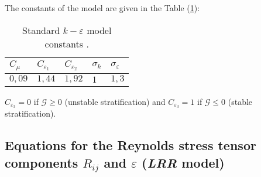 The constants of the model are given in the Table (\ref{tab:k_epsilon_constants}):
\begin{table}[htp]
\centering
\begin{tabular}{p{}|p{}|p{}|p{}|p{}}
$C_\mu$ & $C_{\varepsilon_1}$ & $C_{\varepsilon_2}$ & $\sigma_k$ & $%
\sigma_\varepsilon$ \\ \hline
$0,09$ & $1,44$ & $1,92$ & $1$ & $1,3$ 
\end{tabular}%
\caption{Standard $k-\varepsilon$ model constants \cite{Launder:1972}.\label{tab:k_epsilon_constants}}
\end{table}

$C_{\varepsilon_3}=0$ if $\mathcal{G}\geqslant0$ (unstable stratification)
and $C_{\varepsilon_3}=1$ if $\mathcal{G}\leqslant0$ (stable stratification).


\subsection{Equations for the Reynolds stress tensor components $R_{ij}$ 
and $\varepsilon$ (\emph{LRR} model)}
%

